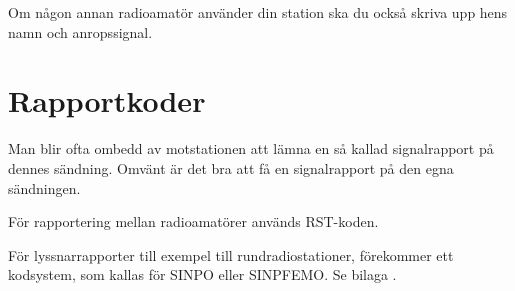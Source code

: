Om någon annan radioamatör använder din station ska du också skriva upp hens
namn och anropssignal.

\section{Rapportkoder}

Man blir ofta ombedd av motstationen att lämna en så kallad signalrapport på
dennes sändning.
Omvänt är det bra att få en signalrapport på den egna sändningen.

För rapportering mellan radioamatörer används RST-koden.

För lyssnarrapporter till exempel till rundradiostationer, förekommer ett
kodsystem, som kallas för SINPO eller SINPFEMO. Se bilaga .
